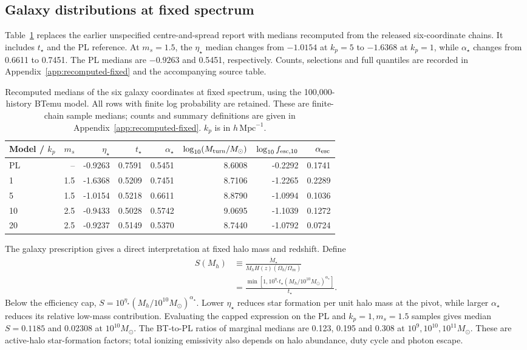 \subsection{Galaxy distributions at fixed spectrum}\label{fixed-spectrum-100k}

Table~\ref{tab:fixed-100k} replaces the earlier unspecified centre-and-spread report with medians recomputed from the released six-coordinate chains. It includes $t_\star$ and the PL reference. At $m_s=1.5$, the $\eta_\star$ median changes from $-1.0154$ at $k_p=5$ to $-1.6368$ at $k_p=1$, while $\alpha_\star$ changes from 0.6611 to 0.7451. The PL medians are $-0.9263$ and 0.5451, respectively. Counts, selections and full quantiles are recorded in Appendix~\ref{app:recomputed-fixed} and the accompanying source table.

\begin{table}[t]\centering\small
\caption{Recomputed medians of the six galaxy coordinates at fixed spectrum, using the 100,000-history BTemu model. All rows with finite log probability are retained. These are finite-chain sample medians; counts and summary definitions are given in Appendix~\ref{app:recomputed-fixed}. $k_p$ is in $h\,\mathrm{Mpc}^{-1}$.}\label{tab:fixed-100k}
\begin{tabular*}{\textwidth}{@{\extracolsep{\fill}}lrrrrrrr}\toprule
Model / $k_p$ & $m_s$ & $\eta_\star$ & $t_\star$ & $\alpha_\star$ & $\log_{10}(M_{\rm turn}/M_\odot)$ & $\log_{10} f_{{\rm esc},10}$ & $\alpha_{\rm esc}$\\\midrule
PL & -- & -0.9263 & 0.7591 & 0.5451 & 8.6008 & -0.2292 & 0.1741\\
1 & 1.5 & -1.6368 & 0.5209 & 0.7451 & 8.7106 & -1.2265 & 0.2289\\
5 & 1.5 & -1.0154 & 0.5218 & 0.6611 & 8.8790 & -1.0994 & 0.1036\\
10 & 2.5 & -0.9433 & 0.5028 & 0.5742 & 9.0695 & -1.1039 & 0.1272\\
20 & 2.5 & -0.9237 & 0.5149 & 0.5370 & 8.7440 & -1.0792 & 0.0724\\
\bottomrule\end{tabular*}\end{table}

The galaxy prescription gives a direct interpretation at fixed halo mass and redshift. Define
\begin{align}
S(M_h)&\equiv\frac{\dot M_\star}{M_hH(z)(\Omega_b/\Omega_m)}\nonumber\\
&=\frac{\min\!\left[1,10^{\eta_\star}t_\star(M_h/10^{10}M_\odot)^{\alpha_\star}\right]}{t_\star}.
\label{eq:physics-sfr-factor}
\end{align}
Below the efficiency cap, $S=10^{\eta_\star}(M_h/10^{10}M_\odot)^{\alpha_\star}$. Lower $\eta_\star$ reduces star formation per unit halo mass at the pivot, while larger $\alpha_\star$ reduces its relative low-mass contribution. Evaluating the capped expression on the PL and $k_p=1,m_s=1.5$ samples gives median $S=0.1185$ and 0.02308 at $10^{10}M_\odot$. The BT-to-PL ratios of marginal medians are 0.123, 0.195 and 0.308 at $10^9,10^{10},10^{11}M_\odot$. These are active-halo star-formation factors; total ionizing emissivity also depends on halo abundance, duty cycle and photon escape.

